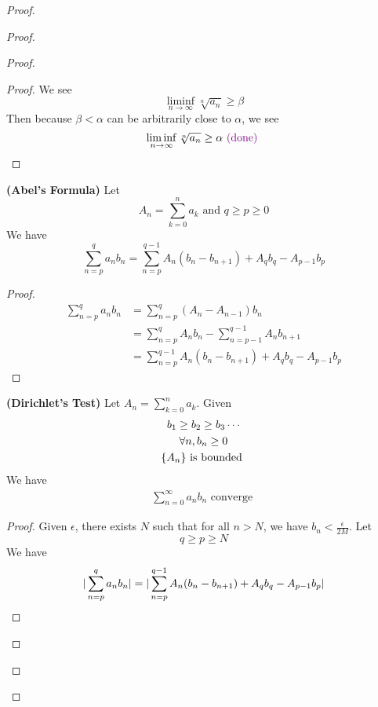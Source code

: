 \documentclass{report}
\begin{document}
\begin{proof}
\begin{proof}
\begin{proof}
\begin{proof}
We see
\begin{equation}
\liminf_{n\to\infty} \sqrt[n]{a_n} \geq \beta 
\end{equation}
Then because $\beta<\alpha $ can be arbitrarily close to $\alpha $, we see
\begin{equation}
\liminf_{n\to\infty} \sqrt[n]{a_n}  \geq \alpha \textcolor{violet}{\text{ (done) }}
\end{equation}
\end{proof}
\begin{lemma}
\label{4.5.4}
\textbf{(Abel's Formula)} Let
\begin{equation}
A_n=\sum_{k=0}^n a_k\text{ and }q\geq p \geq 0
\end{equation}
We have
\begin{equation}
\sum_{n=p}^q a_nb_n=\sum_{n=p}^{q-1}A_n(b_n-b_{n+1})+A_qb_q-A_{p-1}b_p
\end{equation}
\end{lemma}
\begin{proof}
\begin{align}
  \sum_{n=p}^q a_nb_n&=\sum_{n=p}^q (A_{n}-A_{n-1})b_n\\
  &=\sum_{n=p}^q A_nb_n-\sum_{n=p-1}^{q-1}A_nb_{n+1}\\
  &=\sum_{n=p}^{q-1}A_n(b_n-b_{n+1})+A_qb_q-A_{p-1}b_p
\end{align}
\end{proof}
\begin{theorem}
\label{4.5.5}
\textbf{(Dirichlet's Test)} 
Let $A_n=\sum_{k=0}^n a_k$. Given
\begin{gather}
b_1\geq b_2\geq b_3\cdots\\
\forall n, b_n\geq 0\\
\{ A_n \}\text{ is bounded  }
\end{gather}
We have
\begin{gather}
\sum_{n=0}^\infty a_nb_n\text{ converge }
\end{gather}
\end{theorem}
\begin{proof}
Given $\epsilon $, there exists $N$ such that for all $n>N$, we have  $b_n<\frac{\epsilon }{2M}$. Let 
\begin{equation}
q\geq p\geq N
\end{equation}
We have
\begin{align}
\abso{\sum_{n=p}^q a_nb_n}&=\abso{\sum_{n=p}^{q-1}A_n(b_n-b_{n+1})+A_qb_q-A_{p-1}b_p}\\

\end{align}
\end{proof}
\end{proof}
\end{proof}
\end{proof}
\end{document}
